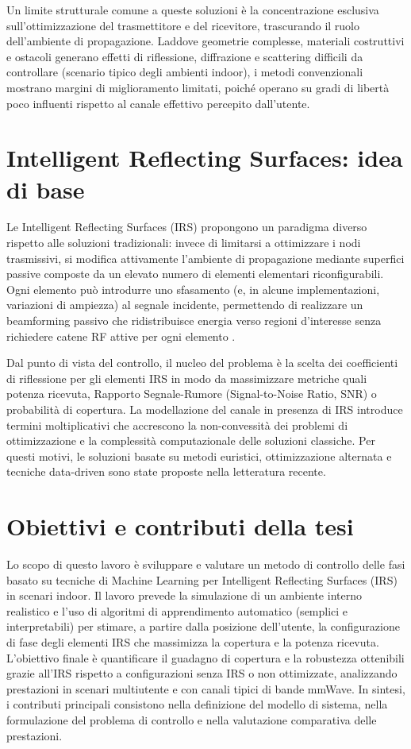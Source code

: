 \documentclass[12pt,a4paper]{report}
\begin{document}
Un limite strutturale comune a queste soluzioni è la concentrazione
esclusiva sull'ottimizzazione del trasmettitore e del ricevitore,
trascurando il ruolo dell'ambiente di propagazione. Laddove geometrie
complesse, materiali costruttivi e ostacoli generano effetti di
riflessione, diffrazione e scattering difficili da controllare
(scenario tipico degli ambienti indoor), i metodi convenzionali
mostrano margini di miglioramento limitati, poiché operano su gradi
di libertà poco influenti rispetto al canale effettivo percepito dall'utente.
\enlargethispage{\baselineskip}

\section{Intelligent Reflecting Surfaces: idea di base}
Le Intelligent Reflecting Surfaces (IRS) propongono un paradigma
diverso rispetto alle soluzioni tradizionali: invece di limitarsi a
ottimizzare i nodi trasmissivi, si modifica attivamente l'ambiente di
propagazione mediante superfici passive composte da un elevato numero
di elementi elementari riconfigurabili. Ogni elemento può introdurre
uno sfasamento (e, in alcune implementazioni, variazioni di ampiezza)
al segnale incidente, permettendo di realizzare un beamforming
passivo che ridistribuisce energia verso regioni d'interesse senza
richiedere catene RF attive per ogni elemento
\cite{3gpp_tr38857,wu2021irs}.

Dal punto di vista del controllo, il nucleo del problema è la scelta
dei coefficienti di riflessione per gli elementi IRS in modo da
massimizzare metriche quali potenza ricevuta, Rapporto
Segnale-Rumore (Signal-to-Noise Ratio, SNR) o probabilità di
copertura. La modellazione del canale in presenza di IRS introduce
termini moltiplicativi che accrescono la non-convessità dei problemi
di ottimizzazione e la complessità computazionale delle soluzioni
classiche. Per questi motivi, le soluzioni basate su metodi
euristici, ottimizzazione alternata e tecniche data-driven sono state
proposte nella letteratura recente.

\section{Obiettivi e contributi della tesi}
Lo scopo di questo lavoro è sviluppare e valutare un metodo di
controllo delle fasi basato su tecniche di Machine Learning per
Intelligent Reflecting Surfaces (IRS) in scenari indoor. Il lavoro
prevede la simulazione di un ambiente interno realistico e l'uso di
algoritmi di apprendimento automatico (semplici e interpretabili) per
stimare, a partire dalla posizione dell'utente, la configurazione di
fase degli elementi IRS che massimizza la copertura e la potenza
ricevuta. L'obiettivo finale è quantificare il guadagno di copertura
e la robustezza ottenibili grazie all'IRS rispetto a configurazioni
senza IRS o non ottimizzate, analizzando prestazioni in scenari
multiutente e con canali tipici di bande mmWave. In sintesi, i
contributi principali consistono nella definizione del modello di
sistema, nella formulazione del problema di controllo e nella
valutazione comparativa delle prestazioni.
\end{document}
